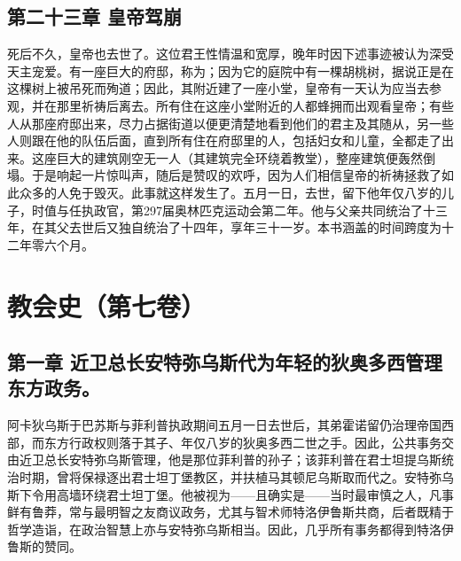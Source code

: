 
\subsection{第二十三章 皇帝驾崩}

死后不久，皇帝也去世了。这位君王性情温和宽厚，晚年时因下述事迹被认为深受天主宠爱。有一座巨大的府邸，称为；因为它的庭院中有一棵胡桃树，据说正是在这棵树上被吊死而殉道；因此，其附近建了一座小堂，皇帝有一天认为应当去参观，并在那里祈祷后离去。所有住在这座小堂附近的人都蜂拥而出观看皇帝；有些人从那座府邸出来，尽力占据街道以便更清楚地看到他们的君主及其随从，另一些人则跟在他的队伍后面，直到所有住在府邸里的人，包括妇女和儿童，全都走了出来。这座巨大的建筑刚空无一人（其建筑完全环绕着教堂），整座建筑便轰然倒塌。于是响起一片惊叫声，随后是赞叹的欢呼，因为人们相信皇帝的祈祷拯救了如此众多的人免于毁灭。此事就这样发生了。五月一日，去世，留下他年仅八岁的儿子，时值与任执政官，第297届奥林匹克运动会第二年。他与父亲共同统治了十三年，在其父去世后又独自统治了十四年，享年三十一岁。本书涵盖的时间跨度为十二年零六个月。\par



\section{教会史（第七卷）}


\subsection{第一章 近卫总长安特弥乌斯代为年轻的狄奥多西管理东方政务。}

阿卡狄乌斯于巴苏斯与菲利普执政期间五月一日去世后，其弟霍诺留仍治理帝国西部，而东方行政权则落于其子、年仅八岁的狄奥多西二世之手。因此，公共事务交由近卫总长安特弥乌斯管理，他是那位菲利普的孙子；该菲利普在君士坦提乌斯统治时期，曾将保禄逐出君士坦丁堡教区，并扶植马其顿尼乌斯取而代之。安特弥乌斯下令用高墙环绕君士坦丁堡。他被视为——且确实是——当时最审慎之人，凡事鲜有鲁莽，常与最明智之友商议政务，尤其与智术师特洛伊鲁斯共商，后者既精于哲学造诣，在政治智慧上亦与安特弥乌斯相当。因此，几乎所有事务都得到特洛伊鲁斯的赞同。\par

